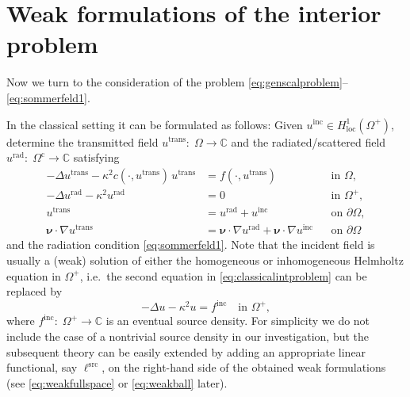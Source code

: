\documentclass[12pt,DIV=14]{scrartcl}
\providecommand{\C}{\mathbb{C}}
\providecommand{\Om}{\Omega}
\providecommand{\pOm}{{\partial\Omega}}
\providecommand{\vecnu}{\boldsymbol{\nu}}
\begin{document}
\section{Weak formulations of the interior problem}

Now we turn to the consideration of the problem \eqref{eq:genscalproblem}--\eqref{eq:sommerfeld1}.

In the classical setting it can be formulated as follows:
Given $u^\mathrm{inc}\in H^1_\mathrm{loc}(\Om^+)$,
determine the transmitted field $u^\mathrm{trans}:\;\Om\to\C$ and
the radiated/scattered field $u^\mathrm{rad}:\;\Om^\mathrm{c}\to\C$
satisfying
\begin{equation}\label{eq:classicalintproblem}
\begin{aligned}
-\Delta u^\mathrm{trans} - \kappa^2 c(\cdot,u^\mathrm{trans}) \,u^\mathrm{trans} &= f(\cdot,u^\mathrm{trans})
&&\text{in }\Om,\\
-\Delta u^\mathrm{rad} - \kappa^2 u^\mathrm{rad} &= 0
&&\text{in }\Om^+,\\
u^\mathrm{trans} &= u^\mathrm{rad} + u^\mathrm{inc}
&&\text{on }\pOm,\\
\vecnu\cdot\nabla u^\mathrm{trans} &= \vecnu\cdot\nabla u^\mathrm{rad}
+ \vecnu\cdot\nabla u^\mathrm{inc}
&&\text{on }\pOm
\end{aligned}
\end{equation}
and the radiation condition \eqref{eq:sommerfeld1}.
Note that the incident field is usually a (weak) solution of either the homogeneous or
inhomogeneous Helmholtz equation in $\Om^+$, i.e.\ the second equation
in \eqref{eq:classicalintproblem} can be replaced by
\begin{equation}\label{eq:classicalintproblem2}
-\Delta u - \kappa^2 u = f^\mathrm{inc}\quad\text{in }\Om^+,
\end{equation}
where $f^\mathrm{inc}:\;\Om^+\to\C$ is an eventual source density.
For simplicity we do not include the case of a nontrivial source density
in our investigation, but the subsequent theory can be easily extended
by adding an appropriate linear functional, say $\ell^\mathrm{src}$,
on the right-hand side of the obtained weak formulations
(see \eqref{eq:weakfullspace} or \eqref{eq:weakball} later).
\end{document}
